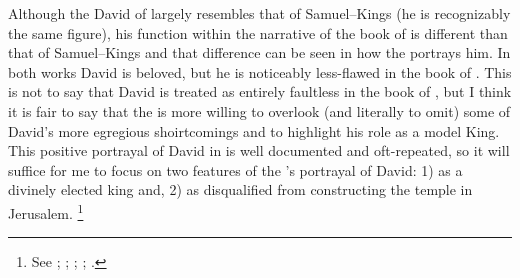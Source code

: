 Although the David of \chronicles largely resembles that of Samuel--Kings (he is recognizably the same figure), his function within the narrative of the book of \chronicles is different than that of Samuel--Kings and that difference can be seen in how the \chronicler portrays him. In both works David is beloved, but he is noticeably less-flawed in the book of \chronicles. This is not to say that  David is treated as entirely faultless in the book of \chronicles, but I think it is fair to say that the \chronicler is more willing to overlook (and literally to omit) some of David's more egregious shoirtcomings and to highlight his role as a model King. This positive portrayal of David in \chronicles is well documented and oft-repeated, so it will suffice for me to focus on two features of the \chronicler's portrayal of David: 1) as a divinely elected king and, 2) as disqualified from constructing the temple in Jerusalem.%
    \footnote{See \cite{jarick_frohlich2019}; \cite[347--383]{japhet2009} \cite{knoppers_biblica1995}; \cite[47--48]{japhet1993}; \cite[44--48]{klein2006}; \cite[80--85]{knoppers2003}.}

